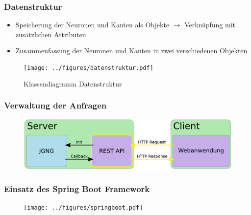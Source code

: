 \begin{frame}
    \frametitle{Datenstruktur}
    \begin{itemize}
        \item Speicherung der Neuronen und Kanten als Objekte
        \newline $\rightarrow$ Verknüpfung mit zusätzlichen Attributen
        \item Zusammenfassung der Neuronen und Kanten in zwei verschiedenen Objekten
    \end{itemize}
    \begin{figure}[h]
        \centering
        \texttt{[image: ../figures/datenstruktur.pdf]}
        \caption{Klassendiagramm Datenstruktur}
    \end{figure}
\end{frame}
\begin{frame}
    \frametitle{Verwaltung der Anfragen}
    \begin{figure}[h]
        \centering
        \includegraphics[width=\textwidth]{bilder/client-server_http-active.pdf}
    \end{figure}
\end{frame}
\begin{frame}
    \frametitle{Einsatz des Spring Boot Framework}
    \begin{figure}[h]
        \centering
        \texttt{[image: ../figures/springboot.pdf]}
    \end{figure}
\end{frame}

